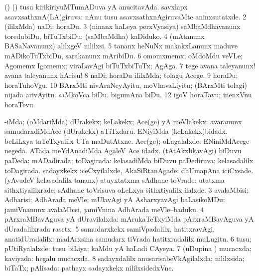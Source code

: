\noindent
\gl{\pagu}
\bmng
\bnum
{}  (\birx) (\AmA) 
\banum
{} tusu kirikiriyuMTumADuva yA anucitavAda. 
 savxlapx asavxsathxnA(LA)giruva:  nAnu tusu asavxsathxnAgiruvaMte aninxsutatxde. 
\eanum
\numie
\num{2}  (ililxMda) naDi; horaDu. 
\num{3}  (ninanx haLeya perxVyasiya) saMbaMdhavanunx toredubiDu, biTuTxbiDu; (saMbaMdha) kaDiduko. 
\num{4}  (mAtanunx BASaNavanunx) alilxgeV nililxsi. 
\num{5}  tananx heNuNx makakxLanunx maduve mADikoTuTxbiDu, sarakanunx mAribiDu. 
\num{6}  omomxmemx; oMdoMdu veVLe; Agomemx Igomemx; viraLavAgi biTuTxbiTuTx; AgAga. 
\num{7}  tege avana taleyanunx! avana taleyanunx hArisu! 
\num{8}  naDi; horaDu ililxMda; tolagu Acege. 
\num{9}  horaDu; horaTuhoVgu. 
\num{10}  BArxMti nivAraNeyAyitu, moVhavaLiyitu; (BArxMti tolagi) nijada arivAyitu. 
  
\banum
{} saMkoVca biDu. 
 bigumAna biDu. 
\eanum
\numie
\num{12}  igoV horaTavu; inenxVnu horaTevu. 
\enum
\emng
\eentry

\bentry
{}
\gl{\upa}
\bmng
\bnum
{} 
\banum
{} -iMda; (oMdariMda) dUrakekx; keLakekx; Ace(ge) yA meVlakekx:  avaranunx samudarxdiMdAce (dUrakekx) aTiTxdaru.  ENiyiMda (keLakekx)bidadx.  beLiLxya taTeTxyalilx UTa maDutAtxne. 
 Ace(ge); oLagalalxde:  ENiniMdAcege negeda.  ATada meYdAnadiMda AgaleV Ace idadx. 
\eanum
\numie
{} 
\banum
{} (tAtAkxlikavAgi) biDuvu paDeda; mADadirada; toDagirada:  kelasadiMda biDuvu paDediruva; kelasadalilx toDagirada. 
 sadayxkekx iceCxyilalxde, AkaSiRtanAgade:  dhUmapAna iciCxsade. 
 (yAvudeV kelasadalilx tananx) atuyxtatxma sAdhane toVrade:  utatxma sithxtiyalilxrade; sAdhane toVrisuva oLeLxya sithxtiyalilx ilalxde. 
\eanum
\numie
\num{3} avalaMbisi; Adharisi; AdhArada meVle; mUlavAgi yA AsharxyavAgi baLasikoMDu:  jamiVnanunx avalaMbisi, jamiVnina AdhArada meVle--baduku. 
\num{4} pArxraMBavAguva yA dUravilalxda:  mArukaTeTxyiMda pArxraMBavAguva yA dUradalilxrada rasetx. 
\num{5} samudarxkekx samiVpadalilx, hatitxravAgi, anatidUradalilx:  madArxsina samudarx tiVrada hatitxradalilx muLugitu. 
\num{6} tusu; pUtiRyalalxde:  tusu biLiya; kaMdu yA haLadi CAyeya. 
\num{7} (uDupina \vi) mucacxda; kaviyada:  hegalu mucacxda. 
\num{8} sadayxdalilx anusarisabeVkAgilalxda; nililxsida; biTaTx; pAlisada:  pathayx sadayxkekx nililxsidedxVne. 
\enum
\emng


